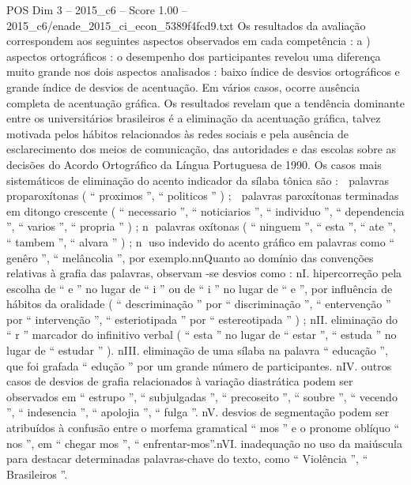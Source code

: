 \begin{textsample}{POS Dim 3 – 2015\_c6 – Score 1.00 – 2015\_c6/enade\_2015\_ci\_econ\_5389f4fcd9.txt}
Os resultados da avaliação correspondem aos seguintes aspectos observados em cada competência : a ) aspectos ortográficos : o desempenho dos participantes revelou uma diferença muito grande nos dois aspectos analisados : baixo índice de desvios ortográficos e grande índice de desvios de acentuação.
Em vários casos, ocorre ausência completa de acentuação gráfica.
Os resultados revelam que a tendência dominante entre os universitários brasileiros é a eliminação da acentuação gráfica, talvez motivada pelos hábitos relacionados às redes sociais e pela ausência de esclarecimento dos meios de comunicação, das autoridades e das escolas sobre as decisões do Acordo Ortográfico da Língua Portuguesa de 1990.
Os casos mais sistemáticos de eliminação do acento indicador da sílaba tônica são :  palavras proparoxítonas ( “ proximos ”, “ politicos ” ) ;  palavras paroxítonas terminadas em ditongo crescente ( “ necessario ”, “ noticiarios ”, “ individuo ”, “ dependencia ”, “ varios ”, “ propria ” ) ; n palavras oxítonas ( “ ninguem ”, “ esta ”, “ ate ”, “ tambem ”, “ alvara ” ) ; n uso indevido do acento gráfico em palavras como “ genêro ”, “ melâncolia ”, por exemplo.nnQuanto ao domínio das convenções relativas à grafia das palavras, observam -se desvios como : nI. hipercorreção pela escolha de “ e ” no lugar de “ i ” ou de “ i ” no lugar de “ e ”, por influência de hábitos da oralidade ( “ descriminação ” por “ discriminação ”, “ entervenção ” por “ intervenção ”, “ esteriotipada ” por “ estereotipada ” ) ; nII. eliminação do “ r ” marcador do infinitivo verbal ( “ esta ” no lugar de “ estar ”, “ estuda ” no lugar de “ estudar ” ). nIII. eliminação de uma sílaba na palavra “ educação ”, que foi grafada “ edução ” por um grande número de participantes. nIV. outros casos de desvios de grafia relacionados à variação diastrática podem ser observados em “ estrupo ”, “ subjulgadas ”, “ precoseito ”, “ soubre ”, “ vecendo ”, “ indesencia ”, “ apolojia ”, “ fulga ”. nV. desvios de segmentação podem ser atribuídos à confusão entre o morfema gramatical “ mos ” e o pronome oblíquo “ nos ”, em “ chegar mos ”, “ enfrentar-mos”.nVI. inadequação no uso da maiúscula para destacar determinadas palavras-chave do texto, como “ Violência ”, “ Brasileiros ”.

\end{textsample}
